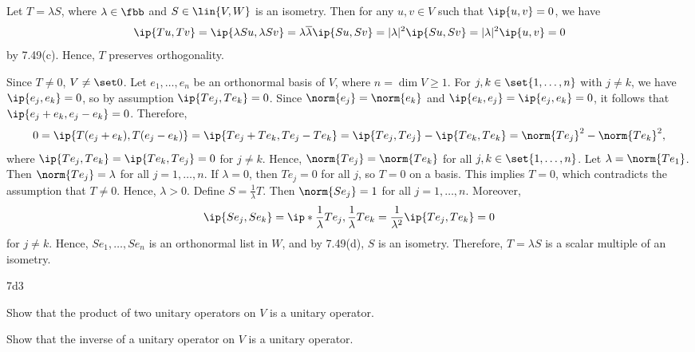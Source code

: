 \begin{soliff}
    \rightimp Let $T = \lambda S$, where $\lambda \in \fbb$ and $S \in \lin{V, W}$ is an isometry.
    Then for any $u, v \in V$ such that $\ip{u, v} = 0$, we have
    \[
        \ip{Tu, Tv} = \ip{\lambda Su, \lambda Sv} = \lambda \overline{\lambda} \ip{Su, Sv} = |\lambda|^2 \ip{Su, Sv} = |\lambda|^2 \ip{u, v} = 0
    \]
    by 7.49(c).
    Hence, $T$ preserves orthogonality.

    \leftimp Since $T \neq 0$, $V \neq \set 0$.
    Let $e_1, \ldots, e_n$ be an orthonormal basis of $V$, where $n = \dim V \geq 1$.
    For $j, k \in \set{1, \ldots, n}$ with $j \neq k$, we have $\ip{e_j, e_k} = 0$, so by assumption $\ip{T e_j, T e_k} = 0$.
    Since $\norm{e_j} = \norm{e_k}$ and $\ip{e_k, e_j} = \ip{e_j, e_k} = 0$, it follows that $\ip{e_j + e_k, e_j - e_k} = 0$.
    Therefore,
    \[
        0 = \ip{T(e_j + e_k), T(e_j - e_k)} = \ip{Te_j + Te_k, Te_j - Te_k} = \ip{Te_j, Te_j} - \ip{Te_k, Te_k} = \norm{Te_j}^2 - \norm{Te_k}^2,
    \]
    where $\ip{Te_j, Te_k} = \ip{Te_k, Te_j} = 0$ for $j \neq k$.
    Hence, $\norm{Te_j} = \norm{Te_k}$ for all $j, k \in \set{1, \ldots, n}$.
    Let $\lambda = \norm{Te_1}$.
    Then $\norm{Te_j} = \lambda$ for all $j = 1, \ldots, n$.
    If $\lambda = 0$, then $T e_j = 0$ for all $j$, so $T = 0$ on a basis.
    This implies $T = 0$, which contradicts the assumption that $T \neq 0$.
    Hence, $\lambda > 0$.
    Define $S = \frac{1}{\lambda} T$.
    Then $\norm{S e_j} = 1$ for all $j = 1, \ldots, n$.
    Moreover,
    \[
        \ip{S e_j, S e_k} = \ip*{\frac{1}{\lambda}T e_j, \frac{1}{\lambda} T e_k} = \frac{1}{\lambda^2} \ip{T e_j, T e_k} = 0
    \]
    for $j \neq k$.
    Hence, $S e_1, \ldots, S e_n$ is an orthonormal list in $W$, and by 7.49(d), $S$ is an isometry.
    Therefore, $T = \lambda S$ is a scalar multiple of an isometry.
\end{soliff}

\begin{exercise}{7d3}
    \begin{subexercises}
        \item Show that the product of two unitary operators on $V$ is a unitary operator.
        \item Show that the inverse of a unitary operator on $V$ is a unitary operator.
    \end{subexercises}

\end{exercise}

